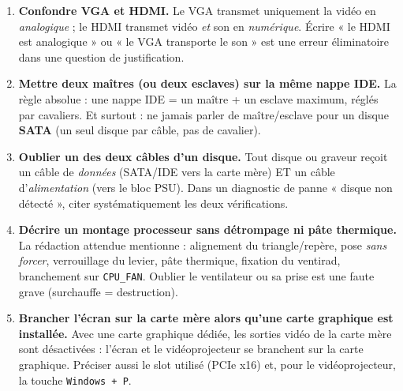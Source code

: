 \documentclass[11pt]{article}
\begin{document}
\begin{attention}
\begin{enumerate}
\item \textbf{Confondre VGA et HDMI.} Le VGA transmet uniquement la vidéo en \emph{analogique} ; le HDMI transmet vidéo \emph{et} son en \emph{numérique}. Écrire « le HDMI est analogique » ou « le VGA transporte le son » est une erreur éliminatoire dans une question de justification.
\item \textbf{Mettre deux maîtres (ou deux esclaves) sur la même nappe IDE.} La règle absolue : une nappe IDE = un maître + un esclave maximum, réglés par cavaliers. Et surtout : ne jamais parler de maître/esclave pour un disque \textbf{SATA} (un seul disque par câble, pas de cavalier).
\item \textbf{Oublier un des deux câbles d'un disque.} Tout disque ou graveur reçoit un câble de \emph{données} (SATA/IDE vers la carte mère) ET un câble d'\emph{alimentation} (vers le bloc PSU). Dans un diagnostic de panne « disque non détecté », citer systématiquement les deux vérifications.
\item \textbf{Décrire un montage processeur sans détrompage ni pâte thermique.} La rédaction attendue mentionne : alignement du triangle/repère, pose \emph{sans forcer}, verrouillage du levier, pâte thermique, fixation du ventirad, branchement sur \texttt{CPU\_FAN}. Oublier le ventilateur ou sa prise est une faute grave (surchauffe = destruction).
\item \textbf{Brancher l'écran sur la carte mère alors qu'une carte graphique est installée.} Avec une carte graphique dédiée, les sorties vidéo de la carte mère sont désactivées : l'écran et le vidéoprojecteur se branchent sur la carte graphique. Préciser aussi le slot utilisé (PCIe x16) et, pour le vidéoprojecteur, la touche \texttt{Windows + P}.
\end{enumerate}
\end{attention}
\end{document}
